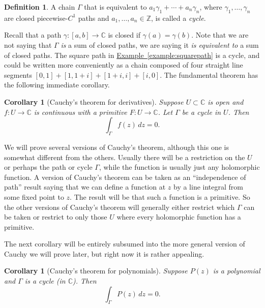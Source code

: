 \documentclass[12pt,openany]{book}
\newcommand{\C}{{\mathbb{C}}}
\newcommand{\Z}{{\mathbb{Z}}}
\newcommand{\myindex}[1]{#1\index{#1}}
\newcommand{\myquote}[1]{``#1''}
\theoremstyle{plain}
\newtheorem{cor}[thm]{Corollary}
\theoremstyle{remark}
\theoremstyle{definition}
\newtheorem{defn}[thm]{Definition}
\theoremstyle{exercise}
\theoremstyle{example}
\newcommand{\exampleref}[1]{\hyperref[#1]{Example~\ref*{#1}}}
\begin{document}
\begin{defn}
A chain $\Gamma$ that is equivalent to
$a_1 \gamma_1 + \cdots + a_n \gamma_n$, where $\gamma_1, \ldots, \gamma_n$
are closed piecewise-$C^1$ paths
and $a_1,\ldots,a_n \in \Z$,
is called a \emph{\myindex{cycle}}.
\end{defn}

Recall that a path $\gamma \colon [a,b] \to \C$ is closed if $\gamma(a) = \gamma(b)$.
Note that we are not saying that $\Gamma$ \emph{is} a sum of closed
paths, we are saying it
\emph{is equivalent to} a sum of closed paths.  The square path in
\exampleref{example:squarepath} is a cycle, and could be written more
conveniently as a chain composed of four straight line segments $[0,1] +
[1,1+i]+[1+i,i]+[i,0]$.
The fundamental theorem has the following
immediate corollary.

\begin{cor}[Cauchy's theorem for derivatives] \label{cor:cauchyforders}
Suppose $U \subset \C$ is open and $f \colon U \to \C$
is continuous with a primitive
$F \colon U \to \C$.
Let $\Gamma$ be
a cycle
in $U$.
Then
\begin{equation*}
\int_\Gamma f(z) \, dz = 0 .
\end{equation*}
\end{cor}

We will prove several versions of Cauchy's theorem, although this one is
somewhat different from the others.  Usually there will be a restriction on
the $U$ or perhaps the path or cycle $\Gamma$,
while the function is usually just any holomorphic function.
A version of Cauchy's theorem can be taken as an \myquote{independence of path}
result saying that we can define a function at $z$ by a line integral
from some fixed point to $z$.  The result will be that such a function is a
primitive.  So the other versions of Cauchy's theorem will generally
either restrict which $\Gamma$ can be taken or
restrict to only those $U$ where every holomorphic function has a primitive.

The next corollary will be entirely
subsumed into the more general version of Cauchy we will prove later,
but right now it is rather appealing.

\begin{cor}[Cauchy's theorem for polynomials] \label{cor:cauchyforpoly}
Suppose $P(z)$ is a polynomial and $\Gamma$ is
a cycle (in $\C$).
Then
\begin{equation*}
\int_\Gamma P(z) \, dz = 0 .
\end{equation*}
\end{cor}
\end{document}
